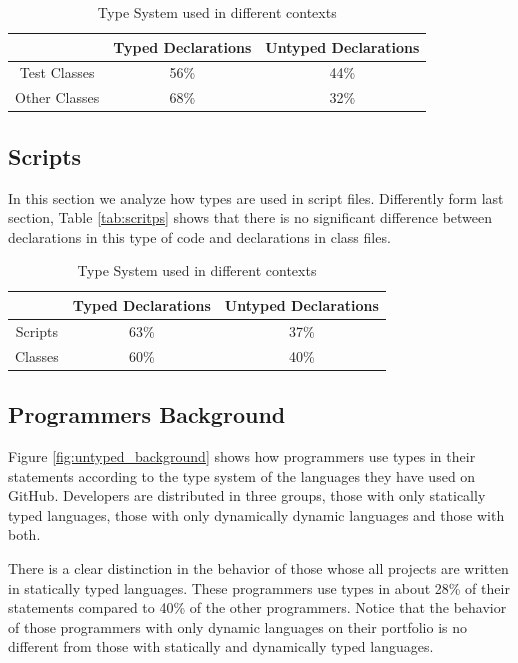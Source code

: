 \documentclass[preprint]{sigplanconf}
\begin{document}
\begin{table}[ht]
\caption{Type System used in different contexts}
\centering{}%
\begin{tabular}{|c|c|c|}
\hline 
 & Typed Declarations & Untyped Declarations\tabularnewline
\hline  
\hline 
Test Classes & 56\% & 44\%\tabularnewline
\hline 
Other Classes & 68\% & 32\%\tabularnewline
\hline 
\end{tabular}
\label{tab:tests}
\end{table}

\subsection{Scripts\label{sub:scripts}}
In this section we analyze how types are used in script files.
Differently form last section, Table \ref{tab:scritps} shows that there is no significant difference between declarations in this type of code and declarations in class files.

\begin{table}[ht]
\caption{Type System used in different contexts}


\centering{}%
\begin{tabular}{|c|c|c|}
\hline 
 & Typed Declarations & Untyped Declarations\tabularnewline
\hline 
\hline 
Scripts & 63\% & 37\%\tabularnewline
\hline 
Classes & 60\% & 40\%\tabularnewline
\hline 
\end{tabular}
\label{tab:scripts}
\end{table}



\subsection{Programmers Background\label{sub:background}}

Figure \ref{fig:untyped_background} shows how programmers use types in their statements according to the type system of the languages they have used on GitHub.
Developers are distributed in three groups, those with only statically typed languages, those with only dynamically dynamic languages and those with both. 

There is a clear distinction in the behavior of those whose all projects are written in statically typed languages.
These programmers use types in about 28\% of their statements compared to 40\% of the other programmers.
Notice that the behavior of those programmers with only dynamic languages on their portfolio is no different from those with statically and dynamically typed languages.
\end{document}
